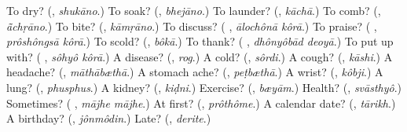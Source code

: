 \begin{tcolorbox}[breakable,colback=teal!4,colframe=teal!35!black,title={Before you move on}]
To dry? (\textbf{}, \emph{shukāno}.) To soak? (\textbf{}, \emph{bhejāno}.) To launder? (\textbf{}, \emph{kāchā}.) To comb? (\textbf{}, \emph{ā̃chṛāno}.) To bite? (\textbf{}, \emph{kāmṛāno}.) To discuss? (\textbf{ }, \emph{ālochônā kôrā}.) To praise? (\textbf{ }, \emph{prôshôngsā kôrā}.) To scold? (\textbf{}, \emph{bôkā}.) To thank? (\textbf{ }, \emph{dhônyôbād deoyā}.) To put up with? (\textbf{ }, \emph{sôhyô kôrā}.) A disease? (\textbf{}, \emph{rog}.) A cold? (\textbf{}, \emph{sôrdi}.) A cough? (\textbf{}, \emph{kāshi}.) A headache? (\textbf{}, \emph{māthābæthā}.) A stomach ache? (\textbf{}, \emph{peṭbæthā}.) A wrist? (\textbf{}, \emph{kôbji}.) A lung? (\textbf{}, \emph{phusphus}.) A kidney? (\textbf{}, \emph{kiḍni}.) Exercise? (\textbf{}, \emph{bæyām}.) Health? (\textbf{}, \emph{svāsthyô}.) Sometimes? (\textbf{ }, \emph{mājhe mājhe}.) At first? (\textbf{}, \emph{prôthôme}.) A calendar date? (\textbf{}, \emph{tārikh}.) A birthday? (\textbf{}, \emph{jônmôdin}.) Late? (\textbf{}, \emph{derite}.)
\end{tcolorbox}
